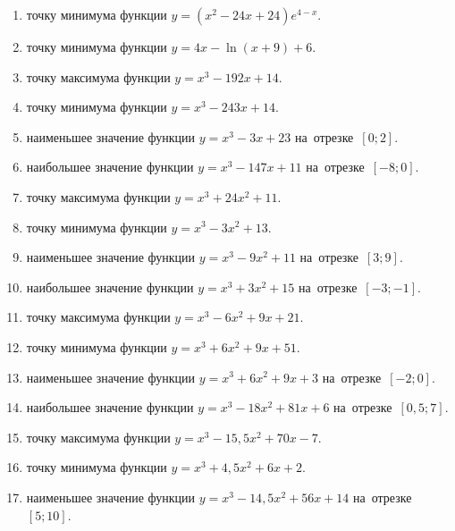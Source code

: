 \documentclass[a4paper,10pt]{article}
\begin{document}
\begin{enumerate}
\item {} точку минимума функции $y=\left(x^2-24x+24\right){{e}^{4-x}}$.

\item {} точку минимума функции $y=4x-\ln \left(x+9\right)+6$.

\item {} точку максимума функции $y=x^3 -192x +14$.

\item {} точку минимума функции $y=x^3 -243x+14$.

\item {} наименьшее значение функции $y=x^3 -3x+23$ на~отрезке~$\left[0;2\right]$.

\item {} наибольшее значение функции $y=x^3 -147x+11$ на~отрезке~$\left[-8;0\right]$.

\item {} точку максимума функции $y=x^3 +24x^2+11$.

\item {} точку минимума функции $y=x^3 -3x^2+13$.

\item {} наименьшее значение функции $y=x^3 -9x^2+11$ на~отрезке~$\left[3;9\right]$.

\item {} наибольшее значение функции $y=x^3 +3x^2+15$ на~отрезке~$\left[-3;-1\right]$.

\item {} точку максимума функции $y=x^3 -6x^2+9x+21$.

\item {} точку минимума функции $y=x^3 +6x^2+9x+51$.

\item {} наименьшее значение функции $y=x^3 +6x^2+9x+3$ на~отрезке~$\left[-2;0\right]$.

\item {} наибольшее значение функции $y=x^3 -18x^2+81x+6$ на~отрезке~$\left[0,5;7\right]$.

\item {} точку максимума функции $y=x^3 -15,5x^2+70x-7$.

\item {} точку минимума функции $y=x^3 +4,5x^2+6x+2$.

\item {} наименьшее значение функции $y=x^3 -14,5x^2+56x+14$ на~отрезке~$\left[5;10\right]$.


\end{enumerate}
\end{document}
